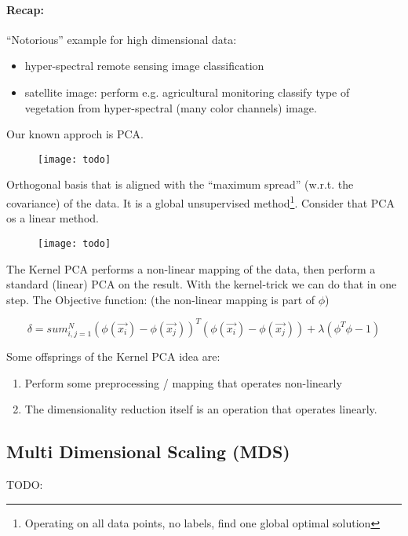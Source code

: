 \paragraph{Recap:}
``Notorious'' example for high dimensional data:
\begin{itemize}
    \item hyper-spectral remote sensing image classification
    \item satellite image:  perform e.g. agricultural monitoring classify type of vegetation from hyper-spectral (many color channels) image.
\end{itemize}

Our known approch is PCA.

\begin{figure}[H]
	\centering
	\texttt{[image: todo]}
\end{figure}

Orthogonal basis that is aligned with the ``maximum spread'' (w.r.t. the covariance) of the data. It is a global unsupervised method\footnote{Operating on all data points, no labels, find one global optimal solution}. Consider that PCA os a linear method.

\begin{figure}[H]
	\centering
	\texttt{[image: todo]}
\end{figure}

The Kernel PCA performs a non-linear mapping of the data, then perform a standard (linear) PCA on the result. With the kernel-trick we can do that in one step. The Objective function: (the non-linear mapping is part of $\phi$)

\begin{equation*}
    \delta = sum_{i,j=1}^{N} (\phi(\vec{x_i}) - \phi(\vec{x_j}))^T (\phi(\vec{x_i}) - \phi(\vec{x_j})) + \lambda (\phi^T\phi-1)
\end{equation*}

Some offsprings of the Kernel PCA idea are:
\begin{enumerate}
    \item Perform some preprocessing / mapping that operates non-linearly
    \item The dimensionality reduction itself is an operation that operates linearly.
\end{enumerate}

\subsection*{Multi Dimensional Scaling (MDS)}
TODO:


